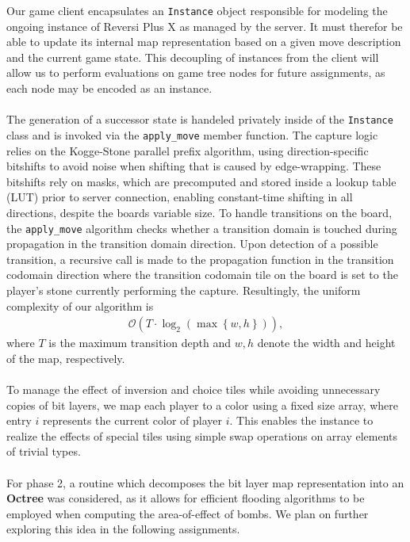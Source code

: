 Our game client encapsulates an \texttt{Instance} object responsible for modeling the ongoing instance of Reversi Plus X as managed by the server. It must therefor be able to update its internal map representation based on a given move description and the current game state. This decoupling of instances from the client will allow us to perform evaluations on game tree nodes for future assignments, as each node may be encoded as an instance.\\\\
The generation of a successor state is handeled privately inside of the \texttt{Instance} class and is invoked via the \texttt{apply\_move} member function. The capture logic relies on the Kogge-Stone parallel prefix algorithm, using direction-specific bitshifts to avoid noise when shifting that is caused by edge-wrapping. These bitshifts rely on masks, which are precomputed and stored inside a lookup table (LUT) prior to server connection, enabling constant-time shifting in all directions, despite the boards variable size. To handle transitions on the board, the \texttt{apply\_move} algorithm checks whether a transition domain is touched during propagation in the transition domain direction. Upon detection of a possible transition, a recursive call is made to the propagation function in the transition codomain direction where the transition codomain tile on the board is set to the player's stone currently performing the capture. Resultingly, the uniform complexity of our algorithm is
\begin{align*}
	\mathcal{O}\left(T \cdot \log_2\left(\max\left\{w, h\right\}\right)\right),
\end{align*}
where \(T\) is the maximum transition depth and \(w, h\) denote the width and height of the map, respectively.\\\\
To manage the effect of inversion and choice tiles while avoiding unnecessary copies of bit layers, we map each player to a color using a fixed size array, where entry \(i\) represents the current color of player \(i\). This enables the instance to realize the effects of special tiles using simple swap operations on array elements of trivial types.\\\\
For phase 2, a routine which decomposes the bit layer map representation into an \textbf{Octree} was considered, as it allows for efficient flooding algorithms to be employed when computing the area-of-effect of bombs. We plan on further exploring this idea in the following assignments.
